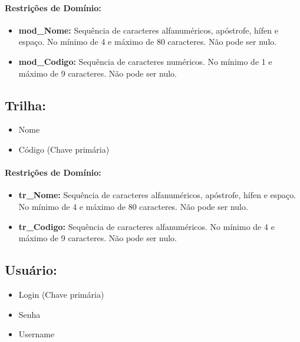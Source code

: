 \documentclass{report}
\begin{document}
\paragraph{Restrições de Domínio:}
\begin{itemize}
  \item \textbf{mod\_Nome:} Sequência de caracteres alfanuméricos, apóstrofe, hífen e espaço. No mínimo de 4 e máximo de 80 caracteres. Não pode ser nulo.
  \item \textbf{mod\_Codigo:} Sequência de caracteres numéricos. No mínimo de 1 e máximo de 9 caracteres. Não pode ser nulo.
\end{itemize}
\subsection{Trilha:}
\begin{itemize}
  \item Nome
  \item Código (Chave primária)
\end{itemize}
\paragraph{Restrições de Domínio:}
\begin{itemize}
  \item \textbf{tr\_Nome:} Sequência de caracteres alfanuméricos, apóstrofe, hífen e espaço. No mínimo de 4 e máximo de 80 caracteres. Não pode ser nulo.
  \item \textbf{tr\_Codigo:} Sequência de caracteres alfanuméricos. No mínimo de 4 e máximo de 9 caracteres. Não pode ser nulo.
\end{itemize}
\subsection{Usuário:}
\begin{itemize}
  \item Login (Chave primária)
  \item Senha
  \item Username
\end{itemize}
\end{document}
